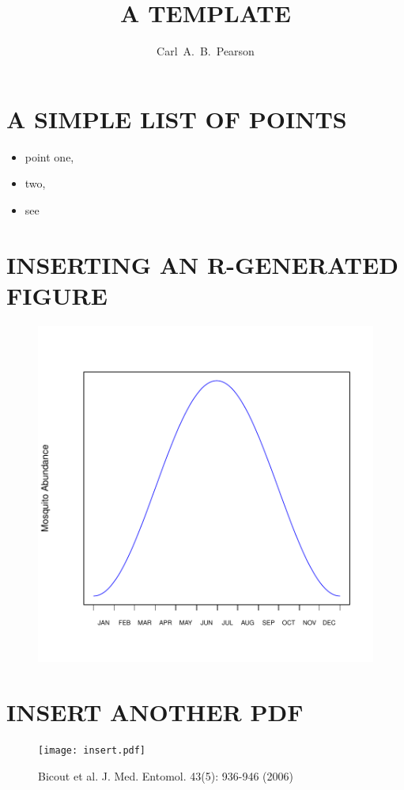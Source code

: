 \documentclass{article}
\author{Carl~A.~B.~Pearson}
\begin{document}

\title{A TEMPLATE}

\titlepage

\section{A SIMPLE LIST OF POINTS}
\begin{itemize}
\item point one,
\item two,
\item see
\end{itemize}

\section{INSERTING AN R-GENERATED FIGURE}
\begin{figure}
\begin{center}
\includegraphics{synthetic-donations-plotfig1}
\end{center}
\end{figure}

\section{INSERT ANOTHER PDF}
\begin{figure}
\begin{center}
\texttt{[image: insert.pdf]}
\caption{Bicout et al. J. Med. Entomol. 43(5): 936-946 (2006)}
\end{center}
\end{figure}
\end{document}
